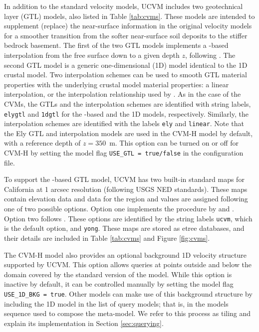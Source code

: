 In addition to the standard velocity models, UCVM includes two geotechnical layer (GTL) models, also listed in Table \ref{tab:cvms}. These models are intended to supplement (replace) the near-surface information in the original velocity models for a smoother transition from the softer near-surface soil deposits to the stiffer bedrock basement. The first of the two GTL models implements a \vsthirty-based interpolation from the free surface down to a given depth $z$, following \citet{Ely_2010_AGU}. The second GTL model is a generic one-dimensional (1D) model identical to the 1D crustal model. Two interpolation schemes can be used to smooth GTL material properties with the underlying crustal model material properties: a linear interpolation, or the interpolation relationship used by \citet{Ely_2010_AGU}. As in the case of the CVMs, the GTLs and the interpolation schemes are identified with string labels, \texttt{elygtl} and \texttt{1dgtl} for the \vsthirty-based and the 1D models, respectively. Similarly, the interpolation schemes are identified with the labels \texttt{ely} and \texttt{linear}. Note that the Ely GTL and interpolation models are used in the CVM-H model by default, with a reference depth of $z=350$~m. This option can be turned on or off for CVM-H by setting the model flag \texttt{USE\_GTL = true/false} in the configuration file.

To support the \vsthirty-based GTL model, UCVM has two built-in standard maps for California at 1 arcsec resolution (following USGS NED standards). These maps contain elevation data and \vsthirty{} data for the region and \vsthirty{} values are assigned following one of two possible options. Option one implements the procedure by \citet{Wills_2006_BSSA} and \citet{Wald_2007_BSSA}. Option two follows \citet{Yong_2012_BSSA}. These options are identified by the string labels \texttt{ucvm}, which is the default option, and \texttt{yong}. These maps are stored as etree databases, and their details are included in Table \ref{tab:cvms} and Figure \ref{fig:cvms}.

The CVM-H model also provides an optional background 1D velocity structure supported by UCVM. This option allows queries at points outside and below the domain covered by the standard version of the model. While this option is inactive by default, it can be controlled manually by setting the model flag \texttt{USE\_1D\_BKG = true}. Other models can make use of this background structure by including the 1D model in the list of query models; that is, in the models sequence used to compose the meta-model. We refer to this process as tiling and explain its implementation in Section \ref{sec:querying}.

